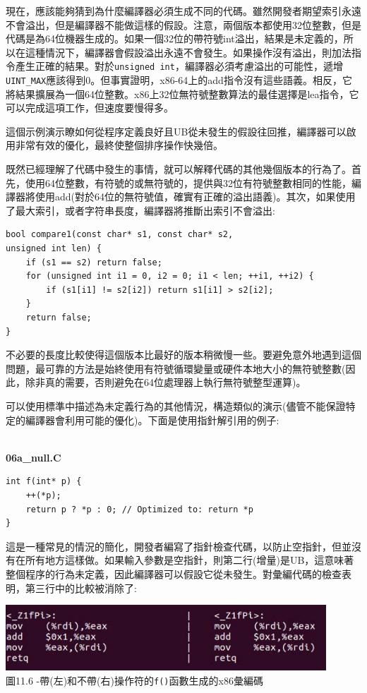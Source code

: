 現在，應該能夠猜到為什麼編譯器必須生成不同的代碼。雖然開發者期望索引永遠不會溢出，但是編譯器不能做這樣的假設。注意，兩個版本都使用32位整數，但是代碼是為64位機器生成的。如果一個32位的帶符號int溢出，結果是未定義的，所以在這種情況下，編譯器會假設溢出永遠不會發生。如果操作沒有溢出，則加法指令產生正確的結果。對於\texttt{unsigned int}，編譯器必須考慮溢出的可能性，遞增\texttt{UINT\_MAX}應該得到0。但事實證明，x86-64上的add指令沒有這些語義。相反，它將結果擴展為一個64位整數。x86上32位無符號整數算法的最佳選擇是lea指令，它可以完成這項工作，但速度要慢得多。

這個示例演示瞭如何從程序定義良好且UB從未發生的假設往回推，編譯器可以啟用非常有效的優化，最終使整個排序操作快幾倍。

既然已經理解了代碼中發生的事情，就可以解釋代碼的其他幾個版本的行為了。首先，使用64位整數，有符號的或無符號的，提供與32位有符號整數相同的性能，編譯器將使用add(對於64位的無符號值，確實有正確的溢出語義)。其次，如果使用了最大索引，或者字符串長度，編譯器將推斷出索引不會溢出:

\begin{lstlisting}[style=styleCXX]
bool compare1(const char* s1, const char* s2,
unsigned int len) {
	if (s1 == s2) return false;
	for (unsigned int i1 = 0, i2 = 0; i1 < len; ++i1, ++i2) {
		if (s1[i1] != s2[i2]) return s1[i1] > s2[i2];
	}
	return false;
}
\end{lstlisting}

不必要的長度比較使得這個版本比最好的版本稍微慢一些。要避免意外地遇到這個問題，最可靠的方法是始終使用有符號循環變量或硬件本地大小的無符號整數(因此，除非真的需要，否則避免在64位處理器上執行無符號整型運算)。

可以使用標準中描述為未定義行為的其他情況，構造類似的演示(儘管不能保證特定的編譯器會利用可能的優化)。下面是使用指針解引用的例子:

\hspace*{\fill} \\ %
\noindent
\textbf{06a\_null.C}
\begin{lstlisting}[style=styleCXX]
int f(int* p) {
	++(*p);
	return p ? *p : 0; // Optimized to: return *p
}
\end{lstlisting}

這是一種常見的情況的簡化，開發者編寫了指針檢查代碼，以防止空指針，但並沒有在所有地方這樣做。如果輸入參數是空指針，則第二行(增量)是UB，這意味著整個程序的行為未定義，因此編譯器可以假設它從未發生。對彙編代碼的檢查表明，第三行中的比較被消除了:

\begin{center}
\includegraphics[width=0.9\textwidth]{content/3/chapter11/images/6.jpg}\\
圖11.6 -帶(左)和不帶(右)操作符的\texttt{f()}函數生成的x86彙編碼
\end{center}

